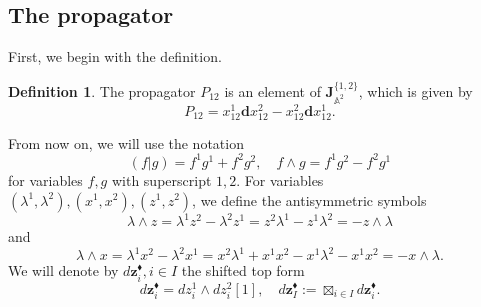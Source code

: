 \documentclass[11pt]{amsart}
\theoremstyle{definition}
\newtheorem{defn}[thm]{Definition}
\theoremstyle{remark}
\numberwithin{equation}{section}
\begin{document}
\subsection{The propagator}
First, we begin with the definition.
\begin{defn}\label{dfn:prop}
    The propagator $P_{12}$ is an element of $\mathbf{J}^{\{1,2\}}_{\mathbb{A}^{2}}$, which is given by
    $$
    P_{12}=x_{12}^1\mathbf{d}x_{12}^{2}-x_{12}^2\mathbf{d}x_{12}^{1}.
    $$
  \end{defn}

From now on, we will use the notation
$$
(f|g)=f^1g^1+f^2g^2,\quad f\wedge g=f^1g^2-f^2g^1
$$
for variables $f,g$ with superscript $1,2$.
For variables $(\lambda^1,\lambda^2), (x^1,x^2), (z^1,z^2)$, we define the antisymmetric symbols
$$
\lambda\wedge z=\lambda^1z^2-\lambda^2z^1=z^2\lambda^1-z^1\lambda^2=-z\wedge\lambda
$$
and
$$
\lambda\wedge x=\lambda^1x^2-\lambda^2x^1=x^2\lambda^1+x^1x^2-x^1\lambda^2-x^1x^2=-x\wedge\lambda.
$$
We will denote by $d\mathbf{z}^{\blacklozenge}_i,i\in {I}$ the shifted top form
$$
d\mathbf{z}^{\blacklozenge}_i=dz_i^1\wedge dz^2_i[1],\quad d\mathbf{z}^{\blacklozenge}_I:=\boxtimes_{i\in I}d\mathbf{z}^{\blacklozenge}_i.
$$
\end{document}
